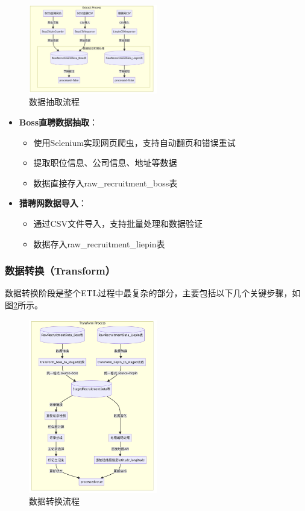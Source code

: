 \begin{figure}[htbp]
    \centering
    \includegraphics[width=0.5\textwidth]{figures/extract.png}
    \caption{数据抽取流程}
    \label{fig:ETL_extract}
\end{figure}


\begin{itemize}
    \item \textbf{Boss直聘数据抽取}：
    \begin{itemize}
        \item 使用Selenium实现网页爬虫，支持自动翻页和错误重试
        \item 提取职位信息、公司信息、地址等数据
        \item 数据直接存入raw\_recruitment\_boss表
    \end{itemize}
    
    \item \textbf{猎聘网数据导入}：
    \begin{itemize}
        \item 通过CSV文件导入，支持批量处理和数据验证
        \item 数据存入raw\_recruitment\_liepin表
    \end{itemize}
\end{itemize}

\subsubsection{数据转换（Transform）}
数据转换阶段是整个ETL过程中最复杂的部分，主要包括以下几个关键步骤，如图\ref{fig:ETL_transform}所示。

\begin{figure}[htbp]
    \centering
    \includegraphics[width=0.5\textwidth]{figures/transform.png}
    \caption{数据转换流程}
    \label{fig:ETL_transform}
\end{figure}

